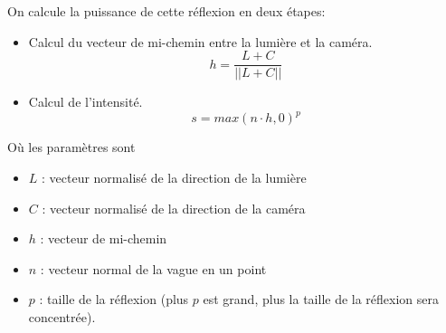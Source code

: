 On calcule la puissance de cette réflexion en deux étapes:
\begin{itemize}
	\item Calcul du vecteur de mi-chemin entre la lumière et la caméra.
	\[h  =  \frac{L + C}{||L + C||} \]
	\item Calcul de l'intensité.
	\[s = max(n \cdot h, 0)^p\]
\end{itemize}
Où les paramètres sont
\begin{itemize}
	\item $L$ : vecteur normalisé de la direction de la lumière 
	\item $C$ : vecteur normalisé de la direction de la caméra
	\item $h$ : vecteur de mi-chemin
	\item $n$ : vecteur normal de la vague en un point
	\item $p$ : taille de la réflexion (plus $p$ est grand, plus la taille de la réflexion sera concentrée).
\end{itemize}


